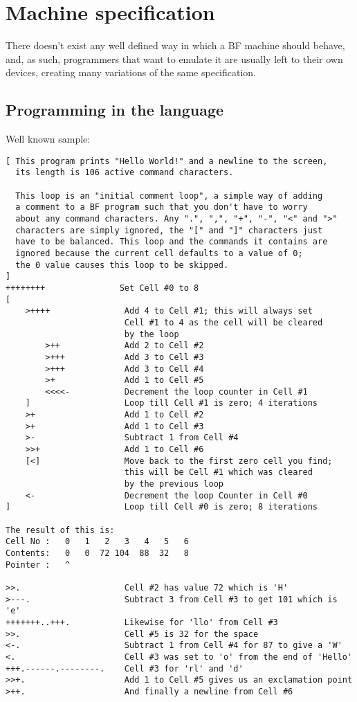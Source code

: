 \section{Machine specification}
\label{sec:ch2sec1}

\par There doesn't exist any well defined way in which a BF machine should behave, and, as such, programmers that want to emulate it are usually left to their own devices, creating many variations of the same specification.

\subsection{Programming in the language}
\label{sec:ch2sec1sub1}

\par Well known sample:

\begin{verbatim}
[ This program prints "Hello World!" and a newline to the screen,
  its length is 106 active command characters.

  This loop is an "initial comment loop", a simple way of adding
  a comment to a BF program such that you don't have to worry
  about any command characters. Any ".", ",", "+", "-", "<" and ">"
  characters are simply ignored, the "[" and "]" characters just
  have to be balanced. This loop and the commands it contains are
  ignored because the current cell defaults to a value of 0;
  the 0 value causes this loop to be skipped.
]
++++++++               Set Cell #0 to 8
[
    >++++               Add 4 to Cell #1; this will always set
                        Cell #1 to 4 as the cell will be cleared
                        by the loop
        >++             Add 2 to Cell #2
        >+++            Add 3 to Cell #3
        >+++            Add 3 to Cell #4
        >+              Add 1 to Cell #5
        <<<<-           Decrement the loop counter in Cell #1
    ]                   Loop till Cell #1 is zero; 4 iterations
    >+                  Add 1 to Cell #2
    >+                  Add 1 to Cell #3
    >-                  Subtract 1 from Cell #4
    >>+                 Add 1 to Cell #6
    [<]                 Move back to the first zero cell you find;
                        this will be Cell #1 which was cleared
                        by the previous loop
    <-                  Decrement the loop Counter in Cell #0
]                       Loop till Cell #0 is zero; 8 iterations

The result of this is:
Cell No :   0   1   2   3   4   5   6
Contents:   0   0  72 104  88  32   8
Pointer :   ^

>>.                     Cell #2 has value 72 which is 'H'
>---.                   Subtract 3 from Cell #3 to get 101 which is 'e'
+++++++..+++.           Likewise for 'llo' from Cell #3
>>.                     Cell #5 is 32 for the space
<-.                     Subtract 1 from Cell #4 for 87 to give a 'W'
<.                      Cell #3 was set to 'o' from the end of 'Hello'
+++.------.--------.    Cell #3 for 'rl' and 'd'
>>+.                    Add 1 to Cell #5 gives us an exclamation point
>++.                    And finally a newline from Cell #6
\end{verbatim}

